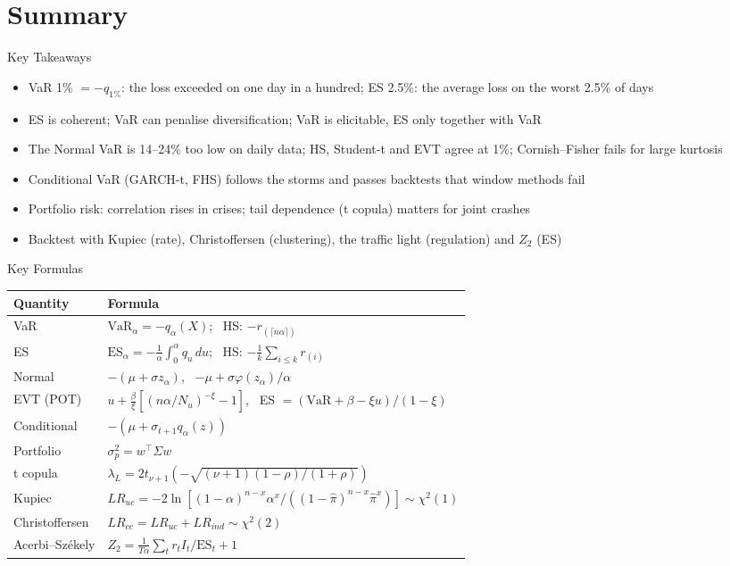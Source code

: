 \section{Summary}

\begin{frame}{Key Takeaways}
\itemsize{\small}
\begin{itemize}
    \item VaR 1\% $= -q_{1\%}$: the loss exceeded on one day in a hundred; ES 2.5\%: the average loss on the worst 2.5\% of days
    \item ES is coherent; VaR can penalise diversification; VaR is elicitable, ES only together with VaR
    \item The Normal VaR is 14--24\% too low on daily data; HS, Student-t and EVT agree at 1\%; Cornish--Fisher fails for large kurtosis
    \item Conditional VaR (GARCH-t, FHS) follows the storms and passes backtests that window methods fail
    \item Portfolio risk: correlation rises in crises; tail dependence (t copula) matters for joint crashes
    \item Backtest with Kupiec (rate), Christoffersen (clustering), the traffic light (regulation) and $Z_2$ (ES)
\end{itemize}
\end{frame}

\begin{frame}{Key Formulas}
\itemsize{\small}
{\renewcommand{\arraystretch}{1.45}\begin{center}
\small
\begin{tabular}{ll}
\toprule
\textbf{Quantity} & \textbf{Formula} \\
\midrule
VaR & $\mathrm{VaR}_\alpha = -q_\alpha(X)$; \ HS: $-r_{(\lceil n\alpha\rceil)}$ \\
ES & $\mathrm{ES}_\alpha = -\frac{1}{\alpha}\int_0^\alpha q_u\,du$; \ HS: $-\frac1k\sum_{i \le k} r_{(i)}$ \\
Normal & $-(\mu + \sigma z_\alpha)$, \ $-\mu + \sigma\varphi(z_\alpha)/\alpha$ \\
EVT (POT) & $u + \frac{\beta}{\xi}[(n\alpha/N_u)^{-\xi} - 1]$, \ ES $= (\mathrm{VaR} + \beta - \xi u)/(1 - \xi)$ \\
Conditional & $-(\mu + \sigma_{t+1}q_\alpha(z))$ \\
Portfolio & $\sigma_p^2 = w^\top\Sigma w$ \\
t copula & $\lambda_L = 2t_{\nu+1}(-\sqrt{(\nu + 1)(1 - \rho)/(1 + \rho)})$ \\
Kupiec & $LR_{uc} = -2\ln[(1-\alpha)^{n-x}\alpha^x/((1-\hat\pi)^{n-x}\hat\pi^x)] \sim \chi^2(1)$ \\
Christoffersen & $LR_{cc} = LR_{uc} + LR_{ind} \sim \chi^2(2)$ \\
Acerbi--Székely & $Z_2 = \frac{1}{T\alpha}\sum_t r_tI_t/\mathrm{ES}_t + 1$ \\
\bottomrule
\end{tabular}
\end{center}
}
\end{frame}

